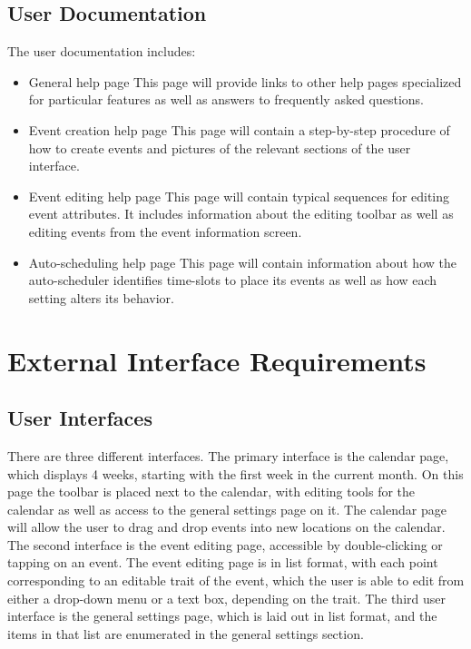 \documentclass{scrreprt}
\begin{document}
\section{User Documentation}
The user documentation includes:
\begin{itemize}
    \item General help page\newline
    This page will provide links to other help pages specialized for particular
    features as well as answers to frequently asked questions.
    \item Event creation help page\newline
    This page will contain a step-by-step procedure of how to create events
    and pictures of the relevant sections of the user interface.
    \item Event editing help page\newline
    This page will contain typical sequences for editing event attributes. It
    includes information about the editing toolbar as well as editing events
    from the event information screen.
    \item Auto-scheduling help page\newline
    This page will contain information about how the auto-scheduler identifies
    time-slots to place its events as well as how each setting alters its behavior.
\end{itemize}


\chapter{External Interface Requirements}

\section{User Interfaces}
There are three different interfaces. The primary interface is the calendar page, which displays 4 weeks, starting with the first week in the current month. On this page the toolbar is placed next to the calendar, with editing tools for the calendar as well as access to the general settings page on it. The calendar page will allow the user to drag and drop events into new locations on the calendar. The second interface is the event editing page, accessible by double-clicking or tapping on an event. The event editing page is in list format, with each point corresponding to an editable trait of the event, which the user is able to edit from either a drop-down menu or a text box, depending on the trait. The third user interface is the general settings page, which is laid out in list format, and the items in that list are enumerated in the general settings section.
\end{document}
